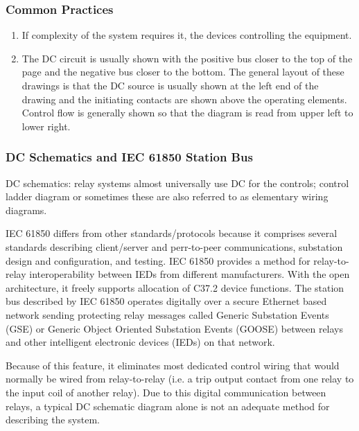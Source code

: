 \subsubsection{Common Practices}
\begin{enumerate}
    \item If complexity of the system requires it, the devices controlling the equipment.
    \item The DC circuit is usually shown with the positive bus closer to the top of the page and the negative bus closer to the bottom. The general layout of these drawings is that the DC source is usually shown at the left end of the drawing and the initiating contacts are shown above the operating elements. Control flow is generally shown so that the diagram is read from upper left to lower right.
\end{enumerate}

\subsubsection{DC Schematics and IEC 61850 Station Bus}
DC schematics: relay systems almost universally use DC for the controls; control ladder diagram or sometimes these are also referred to as elementary wiring diagrams.

IEC 61850 differs from other standards/protocols because it comprises several standards describing client/server and perr-to-peer communications, substation design and configuration, and testing. IEC 61850 provides a method for relay-to-relay interoperability between IEDs from different manufacturers. With the open architecture, it freely supports allocation of C37.2 device functions. The station bus described by IEC 61850 operates digitally over a secure Ethernet based network sending protecting relay messages called Generic Substation Events (GSE) or Generic Object Oriented Substation Events (GOOSE) between relays and other intelligent electronic devices (IEDs) on that network.

Because of this feature, it eliminates most dedicated control wiring that would normally be wired from relay-to-relay (i.e. a trip output contact from one relay to the input coil of another relay). Due to this digital communication between relays, a typical DC schematic diagram alone is not an adequate method for describing the system.